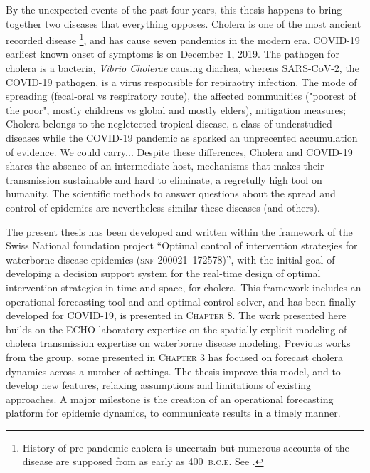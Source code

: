 By the unexpected events of the past four years, this thesis happens to bring together two diseases that everything opposes. Cholera is one of the most ancient recorded disease \footnote{History of pre-pandemic cholera is uncertain but numerous accounts of the disease are supposed from as early as 400~\textsc{b.c.e}. See .}, and has cause seven pandemics in the modern era. COVID-19 earliest known onset of symptoms is on December 1, 2019. The pathogen for cholera is a bacteria, \textit{Vibrio Cholerae} causing diarhea, whereas SARS-CoV-2, the COVID-19 pathogen, is a virus responsible for repiraotry infection. The mode of spreading (fecal-oral vs respiratory route), the affected communities ("poorest of the poor", mostly childrens vs global and mostly elders), mitigation measures; Cholera belongs to the negletected tropical disease, a class of understudied diseases while the COVID-19 pandemic as sparked an unprecented accumulation of evidence\cite{COVID-19OpenAccessProject:LivingEvidenceCOVID19:2020}. We could carry... Despite these differences, Cholera and COVID-19 shares the absence of an intermediate host, mechanisms that makes their transmission sustainable and hard to eliminate, a regretully high tool on humanity.
The scientific methods to answer questions about the spread and control of epidemics are nevertheless similar these diseases (and others).

The present thesis has been developed and written within the framework of the Swiss National foundation project ``Optimal control of intervention strategies for waterborne disease epidemics (\textsc{snf} 200021--172578)'', with the initial goal of developing a decision support system for the real-time design of optimal intervention strategies in time and space, for cholera. This framework includes an operational forecasting tool and and optimal control solver, and has been finally developed for COVID-19, is presented in \textsc{Chapter 8}. The work presented here builds on the ECHO laboratory expertise on the spatially-explicit modeling of cholera transmission expertise on waterborne disease modeling, Previous works from the group, some presented in \textsc{Chapter 3} has focused on forecast cholera dynamics across a number of settings. The thesis  improve this model, and to develop new features, relaxing assumptions and limitations of existing approaches. A major milestone is the creation of an operational forecasting platform for epidemic dynamics, to communicate results in a timely manner.

